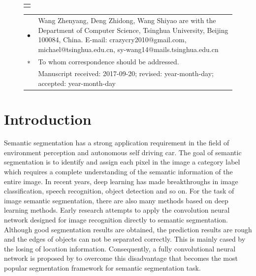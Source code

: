 \documentclass[10.5pt,compsoc]{TsT}
\newcommand{\upcite}[1]{\superscript{\textsuperscript{\cite{#1}}}}
\theoremstyle{mystyle}
\newcommand{\upcite}[1]{\textsuperscript{\cite{#1}}}
\begin{document}
{\begin{strip}
{\begin{tabular}{p{160mm}}
\end{tabular}
}
\vskip 6mm

\vskip -3mm
\end{strip}


\thispagestyle{plain}%
\thispagestyle{empty}%
\makeatother
\pagestyle{tstheadings}

\begin{figure}[b]
\vskip -6mm
\begin{tabular}{p{44mm}}
\toprule\\
\end{tabular}
\vskip -4.5mm
\noindent
\setlength{\tabcolsep}{1pt}
\begin{tabular}{p{1.5mm}p{79.5mm}}
$\bullet$& Wang Zhenyang, Deng Zhidong, Wang Shiyao are with the Department of Computer Science, Tsinghua University, Beijing 100084, China. E-mail: crazycry2010@gmail.com, michael@tsinghua.edu.cn, sy-wang14@mails.tsinghua.edu.cn \\
$\sf{*}$&
To whom correspondence should be addressed. \\
          &          Manuscript received: 2017-09-20; revised: year-month-day; accepted: year-month-day

\end{tabular}
\end{figure}



\section{Introduction}
\label{s:introduction}
\noindent

Semantic segmentation has a strong application requirement in the field of environment perception and autonomous self driving car. The goal of semantic segmentation is to identify and assign each pixel in the image a category label which requires a complete understanding of the semantic information of the entire image. In recent years, deep learning has made breakthroughs in image classification\upcite{1,2,3}, speech recognition\upcite{4}, object detection\upcite{5} and so on. For the task of image semantic segmentation, there are also many methods based on deep learning methods. Early research attempts to apply the convolution neural network designed for image recognition directly to semantic segmentation. Although good segmentation results are obtained, the prediction results are rough and the edges of objects  can not be separated correctly. This is mainly cased by the losing of location information. Consequently, a fully convolutional neural network is proposed by to overcome this disadvantage that becomes the most popular segmentation framework for semantic segmentation task.

}
\end{document}
